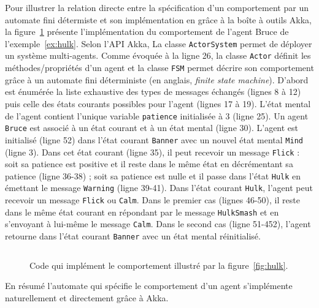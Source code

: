\documentclass[a4paper, 11pt]{article}
\begin{document}
Pour illustrer la relation directe entre la spécification d'un
comportement par un automate fini détermiste et son implémentation en
grâce à la boîte à outils Akka, la figure~\ref{fig:hulkcode} présente
l'implémentation du comportement de l'agent Bruce de
l'exemple~\ref{ex:hulk}. Selon l'API Akka, La classe
\texttt{ActorSystem} permet de déployer un système multi-agents. Comme
évoquée à la ligne 26, la classe \texttt{Actor} définit les
méthodes/propriétés d'un agent et la classe \texttt{FSM} permet
décrire son comportement grâce à un automate fini déterministe (en
anglais, \textit{finite state machine}). D'abord est énumérée la liste
exhaustive des types de messages échangés (lignes 8 à 12) puis celle
des états courants possibles pour l'agent (lignes 17 à 19). L'état
mental de l'agent contient l'unique variable \texttt{patience}
initialisée à $3$ (ligne 25). Un agent \texttt{Bruce} est associé à un
état courant et à un état mental (ligne 30). L'agent est initialisé
(ligne 52) dans l'état courant \texttt{Banner} avec un nouvel état
mental \texttt{Mind} (ligne 3).  Dans cet état courant (ligne 35), il
peut recevoir un message \texttt{Flick} : soit sa patience est
positive et il reste dans le même état en décrémentant sa patience
(ligne 36-38) ; soit sa patience est nulle et il passe dans l'état
\texttt{Hulk} en émettant le message \texttt{Warning} (ligne
39-41). Dans l'état courant \texttt{Hulk}, l'agent peut recevoir un
message \texttt{Flick} ou \texttt{Calm}. Dans le premier cas (lignes
46-50), il reste dans le même état courant en répondant par le message
\texttt{HulkSmash} et en s'envoyant à lui-même le message
\texttt{Calm}. Dans le second cas (ligne 51-452), l'agent retourne dans
l'état courant \texttt{Banner} avec un état mental réinitialisé.

\begin{figure}[htbp]
  \inputminted[breaklines,linenos,fontsize=\scriptsize]{scala}{../src/main/scala/cristalsmac/mas4data/sample/Hulk.scala}
  \caption{Code qui implément le comportement illustré par la
    figure~\ref{fig:hulk}.}
  \label{fig:hulkcode}
\end{figure}


En résumé l'automate qui spécifie le comportement d'un agent
s'implémente naturellement et directement grâce à Akka.



\end{document}
